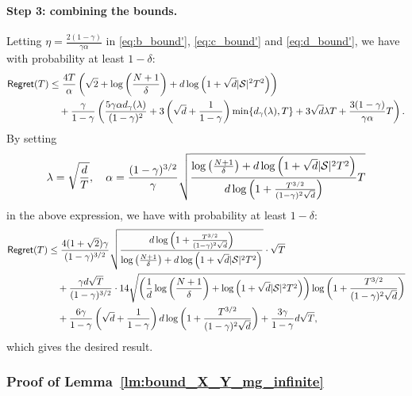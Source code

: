 \paragraph{Step 3: combining the bounds.} Letting $\eta = \frac{2(1-\gamma)}{\gamma\alpha}$ in \eqref{eq:b_bound'}, \eqref{eq:c_bound'} and \eqref{eq:d_bound'}, we have with probability at least $1-\delta$:
\begin{align*}
    \mathsf{Regret}(T)&\leq\frac{4T}{\alpha}\left(\sqrt{2} + \log\left(\frac{N+1}{\delta}\right) + d\log\left(1+\sqrt{d}|{\mathcal{S}}|^2T^2\right)\right)\notag\\
    &\quad+\frac{\gamma}{1-\gamma}\left(\frac{5\gamma\alpha d_\gamma(\lambda)}{(1-\gamma)^2}
    + 3\left(\sqrt{d}+\frac{1}{1-\gamma}\right) \min\{d_\gamma(\lambda),T\} +3\sqrt{d} \lambda T +\frac{3(1-\gamma)}{\gamma\alpha} T\right).
\end{align*}
By setting
\begin{align}
    \lambda =\sqrt{\frac{d}{T}},\quad \alpha = \frac{(1-\gamma)^{3/2}}{\gamma}\sqrt{\frac{\log\left(\frac{N+1}{\delta}\right) + d\log\left(1+\sqrt{d}|{\mathcal{S}}|^2T^2\right)}{d\log\left(1+\frac{T^{3/2}}{(1-\gamma)^2\sqrt{d}}\right)}T}
\end{align}
in the above expression, we have with probability at least $1-\delta$:
\begin{align}
    \mathsf{Regret}(T)&\leq \frac{4(1+\sqrt{2})\gamma}{(1-\gamma)^{3/2}}\sqrt{\frac{d\log\left(1+\frac{T^{3/2}}{(1-\gamma)^2\sqrt{d}}\right)}{\log\left(\frac{N+1}{\delta}\right) + d\log\left(1+\sqrt{d}|{\mathcal{S}}|^2T^2\right)}}\cdot \sqrt{T}\notag\\
    &\quad + \frac{\gamma d\sqrt{T}}{(1-\gamma)^{3/2}}\cdot 14\sqrt{\left(\frac{1}{d}\log\left(\frac{N+1}{\delta}\right) + \log\left(1+\sqrt{d}|{\mathcal{S}}|^2T^2\right)\right)\log\left(1+\frac{T^{3/2}}{(1-\gamma)^2\sqrt{d}}\right)}\notag\\
    &\quad + \frac{6\gamma}{1-\gamma}\left(\sqrt{d}+\frac{1}{1-\gamma}\right) d\log\left(1+\frac{T^{3/2}}{(1-\gamma)^2\sqrt{d}}\right) +\frac{3\gamma}{1-\gamma}d\sqrt{T},
\end{align}
which gives the desired result.


\subsubsection{Proof of Lemma~\ref{lm:bound_X_Y_mg_infinite}}\label{app:proof_bound_X_Y_mg_infinite}

